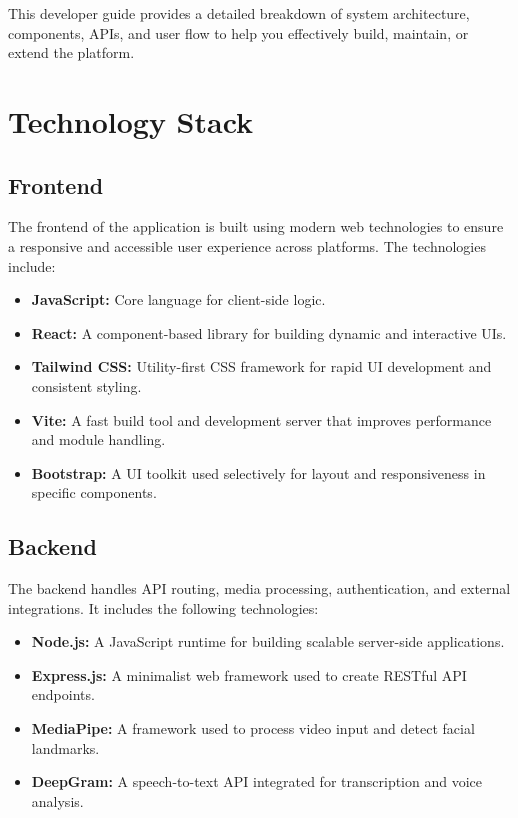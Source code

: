 \documentclass{article}
\begin{document}
This developer guide provides a detailed breakdown of system architecture, components, APIs, and user flow to help you effectively build, maintain, or extend the platform.

\section{Technology Stack}

\subsection{Frontend}
The frontend of the application is built using modern web technologies to ensure a responsive and accessible user experience across platforms. The technologies include:
\begin{itemize}
    \item \textbf{JavaScript:} Core language for client-side logic.
    \item \textbf{React:}  A component-based library for building dynamic and interactive UIs.
    \item \textbf{Tailwind CSS:} Utility-first CSS framework for rapid UI development and consistent styling.
    \item \textbf{Vite:} A fast build tool and development server that improves performance and module handling.
    \item \textbf{Bootstrap:} A UI toolkit used selectively for layout and responsiveness in specific components.
\end{itemize}

\subsection{Backend}
The backend handles API routing, media processing, authentication, and external integrations. It includes the following technologies:
\begin{itemize}
    \item \textbf{Node.js:} A JavaScript runtime for building scalable server-side applications.
    \item \textbf{Express.js:} A minimalist web framework used to create RESTful API endpoints.
    \item \textbf{MediaPipe:} A framework used to process video input and detect facial landmarks.
    \item \textbf{DeepGram:} A speech-to-text API integrated for transcription and voice analysis.
\end{itemize}
\end{document}
